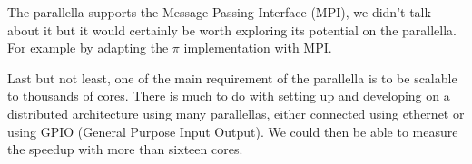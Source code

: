 The parallella supports the Message Passing Interface (MPI), we didn't talk about it but it would certainly be worth exploring its potential on the parallella. For example by adapting the $\pi$ implementation with MPI.

Last but not least, one of the main requirement of the parallella is to be scalable to thousands of cores. There is much to do with setting up and developing on a distributed architecture using many parallellas, either connected using ethernet or using GPIO (General Purpose Input Output). We could then be able to measure the speedup with more than sixteen cores.